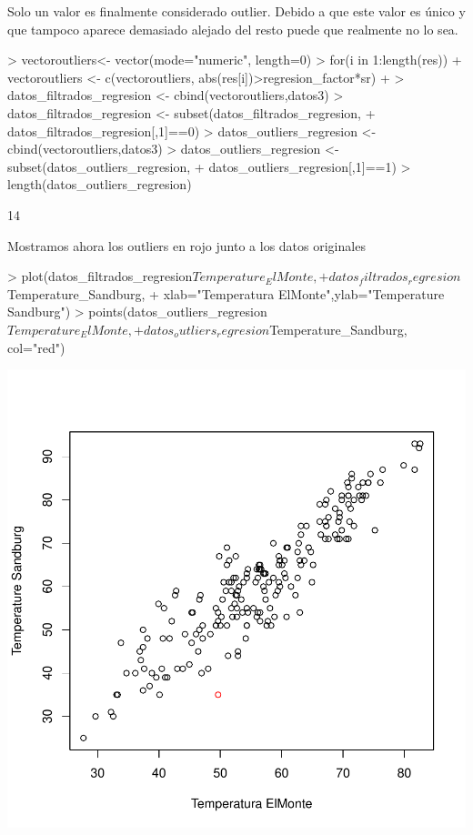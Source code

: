 \documentclass [a4paper] {article}
\begin{document}
Solo un valor es finalmente considerado outlier.
Debido a que este valor es único y que tampoco aparece demasiado alejado del resto puede que realmente no lo sea.
\begin{Schunk}
\begin{Sinput}
> vectoroutliers<- vector(mode="numeric", length=0)
> for(i in 1:length(res)){
+     vectoroutliers <- c(vectoroutliers, abs(res[i])>regresion_factor*sr)
+ }
> datos_filtrados_regresion <- cbind(vectoroutliers,datos3)
> datos_filtrados_regresion <- subset(datos_filtrados_regresion,
+   datos_filtrados_regresion[,1]==0)
> datos_outliers_regresion <- cbind(vectoroutliers,datos3)
> datos_outliers_regresion <- subset(datos_outliers_regresion,
+   datos_outliers_regresion[,1]==1)
> length(datos_outliers_regresion)
\end{Sinput}
\begin{Soutput}
[1] 14
\end{Soutput}
\end{Schunk}

Mostramos ahora los outliers en rojo junto a los datos originales
\begin{center}
\begin{Schunk}
\begin{Sinput}
> plot(datos_filtrados_regresion$Temperature_ElMonte,
+     datos_filtrados_regresion$Temperature_Sandburg,
+     xlab="Temperatura ElMonte",ylab="Temperature Sandburg")
> points(datos_outliers_regresion$Temperature_ElMonte, 
+     datos_outliers_regresion$Temperature_Sandburg, col="red")
\end{Sinput}
\end{Schunk}
\includegraphics{entrega-temp_filter}
\end{center}
\end{document}
